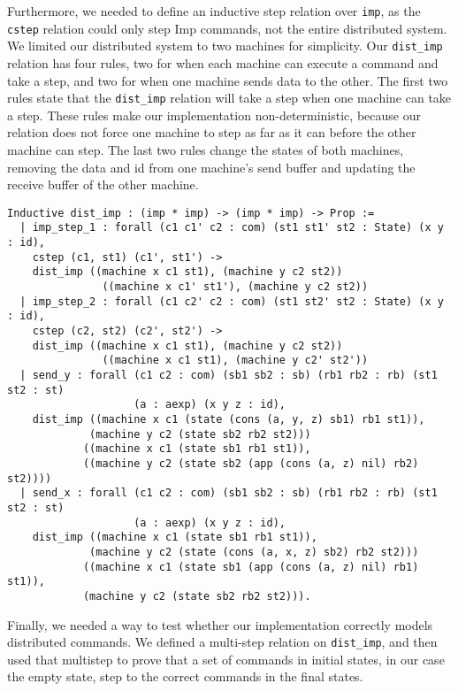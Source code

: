 \documentclass{llncs}
\begin{document}
Furthermore, we needed to define an inductive step relation over \lstinline|imp|, as the \lstinline|cstep| relation could only step Imp commands, not the entire distributed system. We limited our distributed system to two machines for simplicity. Our \lstinline|dist_imp| relation has four rules, two for when each machine can execute a command and take a step, and two for when one machine sends data to the other. The first two rules state that the \lstinline|dist_imp| relation will take a step when one machine can take a step. These rules make our implementation non-deterministic, because our relation does not force one machine to step as far as it can before the other machine can step. The last two rules change the states of both machines, removing the data and id from one machine's send buffer and updating the receive buffer of the other machine.  

\begin{lstlisting}
Inductive dist_imp : (imp * imp) -> (imp * imp) -> Prop :=
  | imp_step_1 : forall (c1 c1' c2 : com) (st1 st1' st2 : State) (x y : id),
    cstep (c1, st1) (c1', st1') ->
    dist_imp ((machine x c1 st1), (machine y c2 st2))
               ((machine x c1' st1'), (machine y c2 st2))
  | imp_step_2 : forall (c1 c2' c2 : com) (st1 st2' st2 : State) (x y : id),
    cstep (c2, st2) (c2', st2') ->
    dist_imp ((machine x c1 st1), (machine y c2 st2))
               ((machine x c1 st1), (machine y c2' st2'))
  | send_y : forall (c1 c2 : com) (sb1 sb2 : sb) (rb1 rb2 : rb) (st1 st2 : st)
                    (a : aexp) (x y z : id),
    dist_imp ((machine x c1 (state (cons (a, y, z) sb1) rb1 st1)),
             (machine y c2 (state sb2 rb2 st2)))
            ((machine x c1 (state sb1 rb1 st1)),
            ((machine y c2 (state sb2 (app (cons (a, z) nil) rb2) st2))))
  | send_x : forall (c1 c2 : com) (sb1 sb2 : sb) (rb1 rb2 : rb) (st1 st2 : st)
                    (a : aexp) (x y z : id),
    dist_imp ((machine x c1 (state sb1 rb1 st1)),
             (machine y c2 (state (cons (a, x, z) sb2) rb2 st2))) 
            ((machine x c1 (state sb1 (app (cons (a, z) nil) rb1) st1)),
            (machine y c2 (state sb2 rb2 st2))).
\end{lstlisting}

Finally, we needed a way to test whether our implementation correctly models distributed commands. We defined a multi-step relation on \lstinline|dist_imp|, and then used that multistep to prove that a set of commands in initial states, in our case the empty state, step to the correct commands in the final states.
\end{document}
